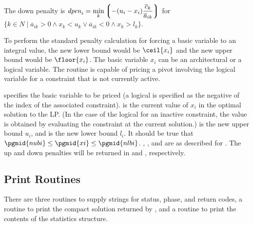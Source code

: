 \begin{subrdoc}
  The down penalty is
  $\displaystyle \mathit{dpen}_i = \min_k  \left\lgroup -(u_i - x_i)
		\frac{\overline{c}_k}{\overline{a}_{ik}}\right\rgroup$
  for $\{k \in N \mid \overline{a}_{ik} > 0 \wedge x_k < u_k \vee
		   \overline{a}_{ik} < 0 \wedge x_k > l_k\}$.

  To perform the standard penalty calculation for forcing a basic variable to
  an integral value, the new lower bound would be $\ceil{x_i}$
  and the new upper bound would be $\floor{x_i}$.
  The basic variable $x_i$ can be an architectural or a logical variable.
  The routine is capable of pricing a pivot involving the logical variable
  for a constraint that is not currently active.

   specifies the basic variable to be priced (a logical is
  specified as the negative of the index of the associated constraint).
   is the current value of $x_i$ in the optimal solution to the
  LP.
  (In the case of the logical for an inactive constraint, the value is obtained
  by evaluating the constraint at the current solution.)
   is the new upper bound $u_i$, and  is the new
  lower bound $l_i$.
  It should be true that $\pgmid{nubi} \leq \pgmid{xi} \leq \pgmid{nlbi}$.
  , , and  are as described for
  .
  The up and down penalties will be returned in  and
  , respectively.

\end{subrdoc}

\subsection{Print Routines}
\label{PrintRoutines}

There are three routines to supply strings for \dylp status, phase, and return
codes, a routine to print the compact solution returned by ,
and a routine to print the contents of the statistics structure.

